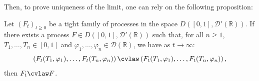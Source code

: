 \noindent Then, to prove uniqueness of the limit, one can rely on the following proposition:
\begin{proposition} \label{prop:mitomaIdentification}
Let $(F_t)_{t\geq 0}$ be a tight family of processes in the space $D\left([0,1],\mathcal{D}'(\mathbb{R})\right)$.  If there exists a process $F\in D\left([0,1],\mathcal{D}'(\mathbb{R})\right)$ such that, for all $n\geq 1$, $T_1,\dots,T_n\in [0,1]$ and $\varphi_1,\dots,\varphi_n \in \mathcal{D}(\mathbb R)$, we have as $t\to\infty$:
\[\left(F_t(T_1,\varphi_1),\dots,F_t(T_n,\varphi_n)\right) \cvlaw \left(F_t(T_1,\varphi_1),\dots,F_t(T_n,\varphi_n)\right),
\]
then $F_t \cvlaw F$.
\end{proposition}


















